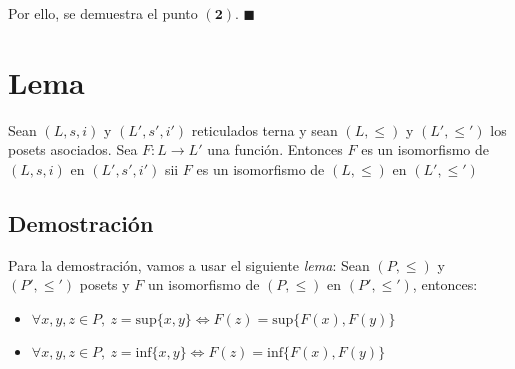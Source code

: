 \documentclass{article}
\begin{document}
Por ello, se demuestra el punto $\mathbf{(2)}$. $\blacksquare$

\section*{Lema}
Sean $(L,s,i)$ y $(L',s',i')$ reticulados terna y sean $(L,\leq)$ y $(L',\leq')$ los posets asociados. Sea $F:L\to L'$ una función. Entonces $F$ es un isomorfismo de $(L,s,i)$ en $(L',s',i')$ sii $F$ es un isomorfismo de $(L,\leq)$ en $(L',\leq')$
\subsection*{Demostración}
Para la demostración, vamos a usar el siguiente \textit{lema}: Sean $(P,\leq)$ y $(P',\leq')$ posets y $F$ un isomorfismo de $(P,\leq)$ en $(P',\leq')$, entonces:
\begin{itemize}
  \item $\forall x,y,z\in P,\ z=\text{sup}\{x,y\}\iff F(z)=\text{sup}\{F(x),F(y)\}$
  \item $\forall x,y,z\in P,\ z=\text{inf}\{x,y\}\iff F(z)=\text{inf}\{F(x),F(y)\}$
\end{itemize}
\end{document}
